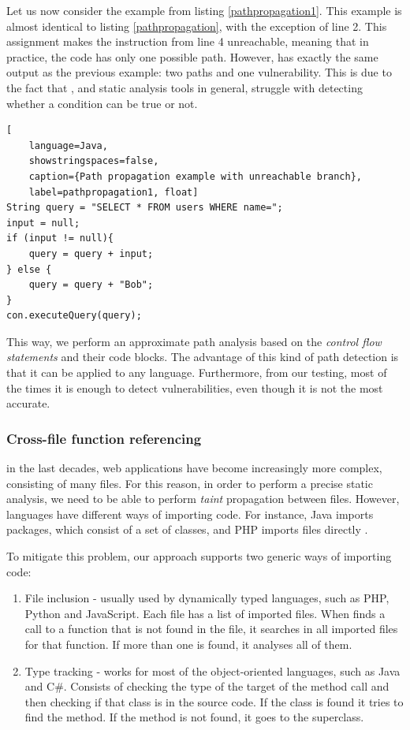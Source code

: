 Let us now consider the example from listing \ref{pathpropagation1}. This example is almost identical to listing \ref{pathpropagation}, with the exception of line 2. This assignment makes the instruction from line 4 unreachable, meaning that in practice, the code has only one possible path. However, \toolname{} has exactly the same output as the previous example: two paths and one vulnerability. This is due to the fact that \toolname{}, and static analysis tools in general, struggle with detecting whether a condition can be true or not.

\begin{lstlisting}[
    language=Java,
    showstringspaces=false,
    caption={Path propagation example with unreachable branch},
    label=pathpropagation1, float] 
String query = "SELECT * FROM users WHERE name=";
input = null;
if (input != null){
    query = query + input;
} else {
    query = query + "Bob";
}
con.executeQuery(query);
\end{lstlisting}

This way, we perform an approximate path analysis based on the \textit{control flow statements} and their code blocks. The advantage of this kind of path detection is that it can be applied to any language. Furthermore, from our testing, most of the times it is enough to detect vulnerabilities, even though it is not the most accurate.


\subsubsection{Cross-file function referencing} in the last decades, web applications have become increasingly more complex, consisting of many files. For this reason, in order to perform a precise static analysis, we need to be able to perform \textit{taint} propagation between files. However, languages have different ways of importing code. For instance, Java imports packages, which consist of a set of classes, and PHP imports files directly \cite{rountev2004static,hills2014static}. 

To mitigate this problem, our approach supports two generic ways of importing code:
\begin{enumerate}
    \item File inclusion - usually used by dynamically typed languages, such as PHP, Python and JavaScript. Each file has a list of imported files. When \toolname{} finds a call to a function that is not found in the file, it searches in all imported files for that function. If more than one is found, it analyses all of them.
    
    \item Type tracking - works for most of the object-oriented languages, such as Java and C\#. Consists of checking the type of the target of the method call and then checking if that class is in the source code. If the class is found it tries to find the method. If the method is not found, it goes to the superclass.
\end{enumerate}

